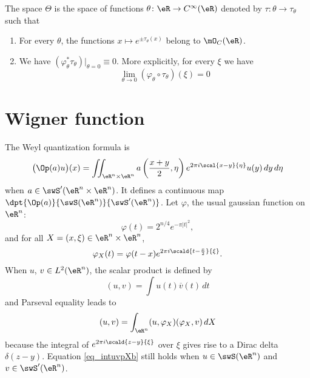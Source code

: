 \begin{definition}
	The space $\Theta$ is the space of functions $\theta\colon \eR\to  C^{\infty}(\eR)$ denoted by $\tau\colon \theta\to \tau_{\theta}$ such that
	\begin{enumerate}
		\item
			For every $\theta$, the functions $x\mapsto e^{\pm\tau_{\theta}(x)}$ belong to $\mO_C(\eR)$.
		\item
			We have $(\varphi_{\theta}^*\tau_{\theta})|_{\theta=0}\equiv 0$. More explicitly, for every $\xi$ we have
			\begin{equation}
				\lim_{\theta\to 0} (\varphi_{\theta}\circ\tau_{\theta})(\xi)=0
			\end{equation}
	\end{enumerate}
\end{definition}

\section{Wigner function}

The Weyl quantization formula is
\begin{equation}
 \big( \Op(a)u \big)(x)=\iint_{\eR^n\times\eR^n} a\left( \frac{ x+y }{ 2 },\eta \right) e^{2\pi i\scal{ x-y }{ \eta }}u(y)\,dy\,d\eta
\end{equation}
when $a\in\swS'(\eR^n\times\eR^n)$. It defines a continuous map $\dpt{ \Op(a)  }{ \swS(\eR^n) }{ \swS'(\eR^n) }$. Let $\varphi$, the usual gaussian function on $\eR^n$:
\[
  \varphi(t)=2^{n/4} e^{-\pi| t |^2},
\]
 and for all $X=(x,\xi)\in\eR^n\times\eR^n$,
\[
  \varphi_X(t)=\varphi(t-x) e^{2\pi i\scald{ t-\frac{ x }{2} }{ \xi }}.
\]
When $u$, $v\in L^2(\eR^n)$, the scalar product is defined by
\begin{equation}
(u,v)=\int u(t)\overline{ v }(t)\,dt
\end{equation}
and Parseval equality leads to
\begin{equation}  \label{eq_intuvpXb}
  (u,v)=\int_{\eR^n}(u,\varphi_X)(\varphi_X,v)\,dX
\end{equation}
because the integral of $ e^{2\pi i\scald{ z-y }{ \xi }}$ over $\xi$ gives rise to a Dirac delta $\delta(z-y)$. Equation \eqref{eq_intuvpXb} still holds when $u\in\swS(\eR^n)$ and $v\in\swS'(\eR^n)$.

